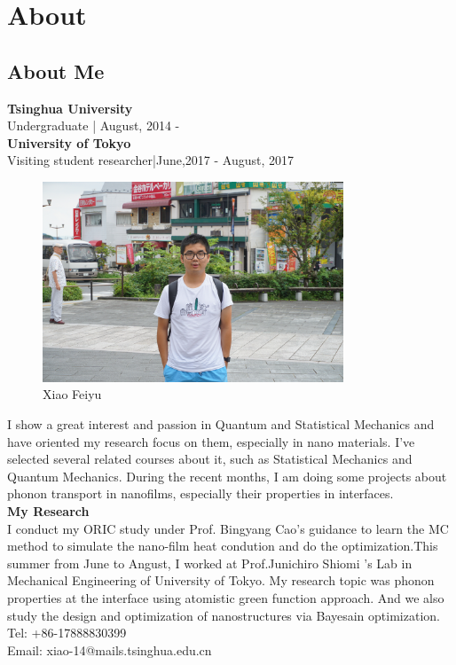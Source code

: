 \chapter{About}
\graphicspath{{Appendix4/}}
\section*{About Me}
\textbf{Tsinghua University}\\
Undergraduate | August, 2014 - \\
\textbf{University of Tokyo}\\
Visiting student researcher|June,2017 - August, 2017\\
\begin{figure}[htbp!] 
\centering    
\includegraphics[width=0.8\textwidth]{xiao.png}
\caption[Xiao Feiyu]{Xiao Feiyu}
\end{figure}
I show a great interest and passion in Quantum and Statistical Mechanics and have oriented my research focus on them, especially in nano materials. I've selected several related courses about it, such as Statistical Mechanics and Quantum Mechanics. During the recent months, I am doing some projects about phonon transport in nanofilms, especially their properties in interfaces. \\
\textbf{My Research}\\
I conduct my ORIC study under Prof. Bingyang Cao's guidance to learn the MC method to simulate the nano-film heat condution and do the optimization.This summer from June to Angust, I worked at Prof.Junichiro Shiomi 's Lab in Mechanical Engineering of University of Tokyo. My research topic was phonon properties at the interface using atomistic green function approach. And we also study the design and optimization of nanostructures via Bayesain optimization.\\
Tel: +86-17888830399\\
Email: xiao-14@mails.tsinghua.edu.cn\\


